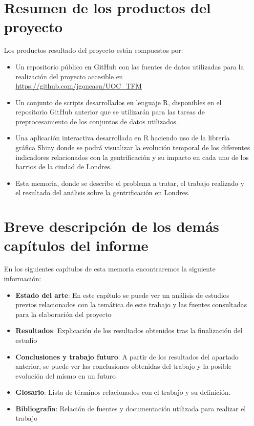 \documentclass[12pt,a4paper,twoside]{book}
\begin{document}
\section{Resumen de los productos del proyecto}

Los productos resultado del proyecto están compuestos por:
\begin{itemize}
    \item Un repositorio público en GitHub con las fuentes de datos utilizadas para la realización del proyecto accesible en \href{https://github.com/jgoncasu/UOC_TFM}{https://github.com/jgoncasu/UOC\_TFM}
    \item Un conjunto de scripts desarrollados en lenguaje R, disponibles en el repositorio GitHub anterior que se utilizarán para las tareas de preprocesamiento de los conjuntos de datos utilizados.
    \item Una aplicación interactiva desarrollada en R haciendo uso de la librería gráfica Shiny donde se podrá visualizar la evolución temporal de los diferentes indicadores relacionados con la gentrificación y su impacto en cada uno de los barrios de la ciudad de Londres.
    \item Esta memoria, donde se describe el problema a tratar, el trabajo realizado y el resultado del análisis sobre la gentrificación en Londres.
\end{itemize}

\section{Breve descripción de los demás capítulos del informe}

En los siguientes capítulos de esta memoria encontraremos la siguiente información:

\begin{itemize}
    \item \textbf{Estado del arte}: En este capítulo se puede ver un análisis de estudios previos relacionados con la temática de este trabajo y las fuentes consultadas para la elaboración del proyecto
    \item \textbf{Resultados}: Explicación de los resultados obtenidos tras la finalización del estudio
    \item \textbf{Conclusiones y trabajo futuro}: A partir de los resultados del apartado anterior, se puede ver las conclusiones obtenidas del trabajo y la posible evolución del mismo en un futuro
    \item \textbf{Glosario}: Lista de términos relacionados con el trabajo y su definición.
    \item \textbf{Bibliografía}: Relación de fuentes y documentación utilizada para realizar el trabajo
\end{itemize}
\end{document}
